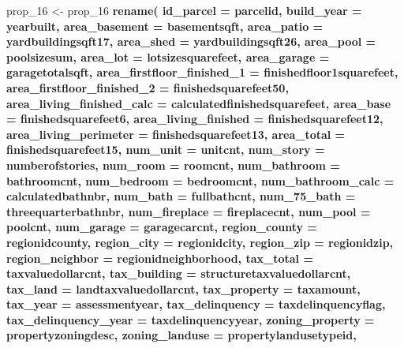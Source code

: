 \documentclass[]{book}
\newenvironment{Shaded}{\begin{snugshade}}{\end{snugshade}}
\newcommand{\KeywordTok}[1]{\textcolor[rgb]{0.13,0.29,0.53}{\textbf{#1}}}
\newcommand{\DataTypeTok}[1]{\textcolor[rgb]{0.13,0.29,0.53}{#1}}
\newcommand{\DecValTok}[1]{\textcolor[rgb]{0.00,0.00,0.81}{#1}}
\newcommand{\StringTok}[1]{\textcolor[rgb]{0.31,0.60,0.02}{#1}}
\newcommand{\OperatorTok}[1]{\textcolor[rgb]{0.81,0.36,0.00}{\textbf{#1}}}
\newcommand{\NormalTok}[1]{#1}
\theoremstyle{definition}
\theoremstyle{definition}
\theoremstyle{definition}
\theoremstyle{remark}
\begin{document}
\begin{Shaded}
\begin{Highlighting}[]
\NormalTok{prop_}\DecValTok{16}\NormalTok{ <-}\StringTok{ }\NormalTok{prop_}\DecValTok{16} \OperatorTok{%>%}\StringTok{ }
\StringTok{  }\KeywordTok{rename}\NormalTok{(}
    \DataTypeTok{id_parcel =}\NormalTok{ parcelid,}
    \DataTypeTok{build_year =}\NormalTok{ yearbuilt,}
    \DataTypeTok{area_basement =}\NormalTok{ basementsqft,}
    \DataTypeTok{area_patio =}\NormalTok{ yardbuildingsqft17,}
    \DataTypeTok{area_shed =}\NormalTok{ yardbuildingsqft26, }
    \DataTypeTok{area_pool =}\NormalTok{ poolsizesum,  }
    \DataTypeTok{area_lot =}\NormalTok{ lotsizesquarefeet, }
    \DataTypeTok{area_garage =}\NormalTok{ garagetotalsqft,}
    \DataTypeTok{area_firstfloor_finished_1 =}\NormalTok{ finishedfloor1squarefeet,}
    \DataTypeTok{area_firstfloor_finished_2 =}\NormalTok{ finishedsquarefeet50,}
    \DataTypeTok{area_living_finished_calc =}\NormalTok{ calculatedfinishedsquarefeet,}
    \DataTypeTok{area_base =}\NormalTok{ finishedsquarefeet6,}
    \DataTypeTok{area_living_finished =}\NormalTok{ finishedsquarefeet12,}
    \DataTypeTok{area_living_perimeter =}\NormalTok{ finishedsquarefeet13,}
    \DataTypeTok{area_total =}\NormalTok{ finishedsquarefeet15,  }
    \DataTypeTok{num_unit =}\NormalTok{ unitcnt, }
    \DataTypeTok{num_story =}\NormalTok{ numberofstories,  }
    \DataTypeTok{num_room =}\NormalTok{ roomcnt,}
    \DataTypeTok{num_bathroom =}\NormalTok{ bathroomcnt,}
    \DataTypeTok{num_bedroom =}\NormalTok{ bedroomcnt,}
    \DataTypeTok{num_bathroom_calc =}\NormalTok{ calculatedbathnbr,}
    \DataTypeTok{num_bath =}\NormalTok{ fullbathcnt,  }
    \DataTypeTok{num_75_bath =}\NormalTok{ threequarterbathnbr, }
    \DataTypeTok{num_fireplace =}\NormalTok{ fireplacecnt,}
    \DataTypeTok{num_pool =}\NormalTok{ poolcnt,  }
    \DataTypeTok{num_garage =}\NormalTok{ garagecarcnt,  }
    \DataTypeTok{region_county =}\NormalTok{ regionidcounty,}
    \DataTypeTok{region_city =}\NormalTok{ regionidcity,}
    \DataTypeTok{region_zip =}\NormalTok{ regionidzip,}
    \DataTypeTok{region_neighbor =}\NormalTok{ regionidneighborhood,  }
    \DataTypeTok{tax_total =}\NormalTok{ taxvaluedollarcnt,}
    \DataTypeTok{tax_building =}\NormalTok{ structuretaxvaluedollarcnt,}
    \DataTypeTok{tax_land =}\NormalTok{ landtaxvaluedollarcnt,}
    \DataTypeTok{tax_property =}\NormalTok{ taxamount,}
    \DataTypeTok{tax_year =}\NormalTok{ assessmentyear,}
    \DataTypeTok{tax_delinquency =}\NormalTok{ taxdelinquencyflag,}
    \DataTypeTok{tax_delinquency_year =}\NormalTok{ taxdelinquencyyear,}
    \DataTypeTok{zoning_property =}\NormalTok{ propertyzoningdesc,}
    \DataTypeTok{zoning_landuse =}\NormalTok{ propertylandusetypeid,}
}
\end{Highlighting}
\end{Shaded}
\end{document}
